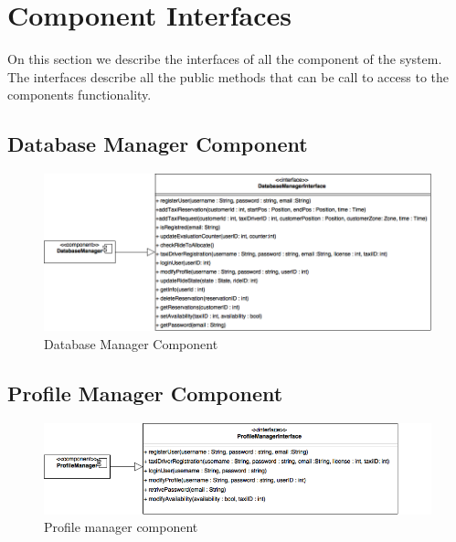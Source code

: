 \documentclass[../../../../dd.tex]{subfiles}
\begin{document}
	\section{Component Interfaces}
	On this section we describe the interfaces of all the component of the system. The interfaces describe all the public methods that can be call to access to the components functionality.
		
		\subsection{Database Manager Component}
		\begin{figure}[H]
				\centering
				\includegraphics[width=\textwidth, scale=0.5]{../images/DatabaseManagerComponent.png}
			\caption{Database Manager Component}\label{fig:DBMSC}
		\end{figure}
		
		\subsection{Profile Manager Component}
		\begin{figure}[H]
				\centering
				\includegraphics[width=\textwidth, scale=0.5]{../images/ProfileManagerComponent.png}
			\caption{Profile manager component}\label{fig:PMC}
		\end{figure}
		
\end{document}
